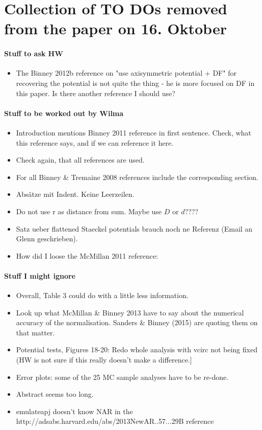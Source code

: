 \section{Collection of TO DOs removed from the paper on 16. Oktober}

\paragraph{Stuff to ask HW}
\begin{itemize}
\item The Binney 2012b reference on "use axisymmetric potential + DF" for recovering the potential is not quite the thing - he is more focused on DF in this paper. Is there another reference I should use?
\end{itemize}

\paragraph{Stuff to be worked out by Wilma}
\begin{itemize}
\item Introduction mentions Binney 2011 reference in first sentence. Check, what this reference says, and if we can reference it here.
\item Check again, that all references are used.
\item For all Binney \& Tremaine 2008 references include the corresponding section.
\item Absätze mit Indent. Keine Leerzeilen.
\item Do not use r as distance from sum. Maybe use $D$ or $d$????
\item Satz ueber flattened Staeckel potentials brauch noch ne Referenz (Email an Glenn geschrieben).
\item How did I loose the McMillan 2011 reference: %
\end{itemize}

\paragraph{Stuff I might ignore}
\begin{itemize}
\item Overall, Table 3 could do with a little less information.
\item Look up what McMillan \& Binney 2013 have to say about the numerical accuracy of the normalisation. Sanders \& Binney (2015) are quoting them on that matter.
\item Potential tests, Figures 18-20: Redo whole analysis with vcirc not being fixed (HW is not sure if this really doesn't make a difference.]
\item Error plots: some of the 25 MC sample analyses have to be re-done.
\item Abstract seems too long.
\item emulateapj doesn't know NAR in the http://adsabs.harvard.edu/abs/2013NewAR..57...29B reference
\end{itemize}


